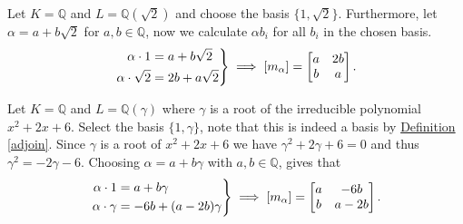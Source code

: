 \documentclass[openany, a4paper, 10pt]{book}
\theoremstyle{plain}
\theoremstyle{plain}
\theoremstyle{plain}
\theoremstyle{definition}
\theoremstyle{plain}
\theoremstyle{definition}
\theoremstyle{remark}
\newcommand{\defref}[1]{\hyperref[#1]{Definition \ref{#1}}}
\newenvironment{rcases}{\left.\begin{aligned}}{\end{aligned}\right\rbrace}
\begin{document}
\begin{examplebox}[label={traces}, nameref={previous examples}]
    Let $K=\mathbb Q$ and $L = \mathbb Q(\sqrt{2})$ and choose the basis $\{ 1, \sqrt{2} \}$.
    Furthermore, let $\alpha = a+b\sqrt{2}$ for $a,b \in \mathbb Q$,
    now we calculate $\alpha b_i$ for all $b_i$ in the chosen basis.
    \begin{equation*}
        \begin{rcases}
            \alpha \cdot 1 &= a + b \sqrt{2} \\
            \alpha \cdot \sqrt{2} &= 2b + a\sqrt{2}
        \end{rcases}
        \implies
        [m_\alpha] =
        \begin{bmatrix}
            a & 2b \\
            b & a
        \end{bmatrix}.
    \end{equation*}%
    \vspace{-.9em}
    \tcbline
    \vspace{-.3em}

    Let $K=\mathbb Q$ and $L = \mathbb Q(\gamma)$ where $\gamma$ is a root of the irreducible polynomial $x^2+2x+6$.
    Select the basis $\{ 1, \gamma \}$, note that this is indeed a basis by \defref{adjoin}.
    Since $\gamma$ is a root of $x^2+2x+6$ we have $\gamma^2+2\gamma+6=0$ and thus $\gamma^2 = -2\gamma - 6$.
    Choosing $\alpha = a+b\gamma$ with $a,b \in \mathbb Q$, gives that
    \vspace{-.3em}
    \begin{equation*}
        \begin{rcases}
            \alpha \cdot 1 &= a + b \gamma \\
            \alpha \cdot \gamma &= -6b + (a-2b)\gamma
        \end{rcases}
        \implies
        [m_\alpha] =
        \begin{bmatrix}
            a & -6b \\
            b & a-2b
        \end{bmatrix}.
    \end{equation*}%
    \vspace{-.9em}
    \tcbline


\end{examplebox}
\end{document}
